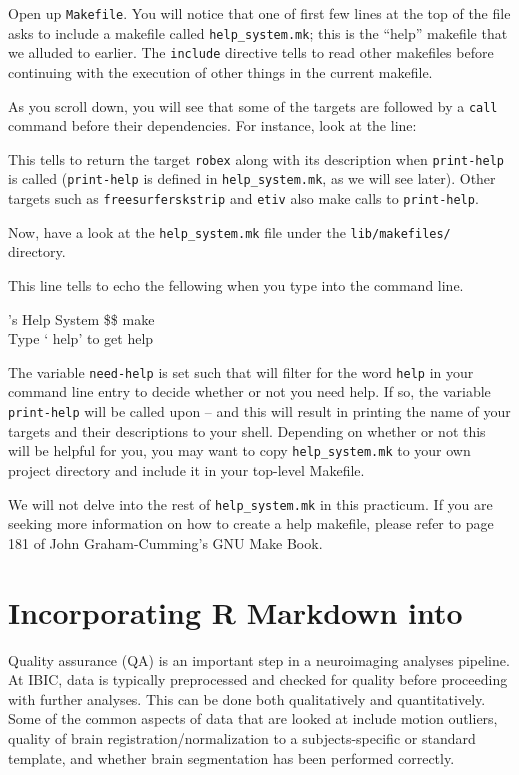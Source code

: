Open up \texttt{Makefile}. You will notice that one of first few lines at the top of the file asks \maken{} to include a makefile called \texttt{help_system.mk}; this is the ``help'' makefile that we alluded to earlier. The \texttt{include} directive tells \maken{} to read other makefiles before continuing with the execution of other things in the current makefile.  

As you scroll down, you will see that some of the targets are followed by a \texttt{call} command before their dependencies. For instance, look at the line:

This tells \maken{} to return the target \texttt{robex} along with its description when \texttt{print-help} is called (\texttt{print-help} is defined in \texttt{help_system.mk}, as we will see later). Other targets such as \texttt{freesurferskstrip} and \texttt{etiv} also make calls to \texttt{print-help}.

Now, have a look at the \texttt{help_system.mk} file under the \texttt{lib/makefiles/} directory.  

This line tells \maken{} to echo the fellowing when you type \maken{} into the command line.
\begin{bash}{\maken{}'s Help System}{}
\$\$ make \\
Type `\maken{} help' to get help
\end{bash}

The variable \texttt{need-help} is set such that \maken{} will filter for the word \texttt{help} in your command line entry to decide whether or not you need help. If so, the variable \texttt{print-help} will be called upon -- and this will result in \maken{} printing the name of your targets and their descriptions to your shell. Depending on whether or not this will be helpful for you, you may want to copy \texttt{help_system.mk} to your own project directory and include it in your top-level Makefile. 

We will not delve into the rest of \texttt{help_system.mk} in this practicum. If you are seeking more information on how to create a help makefile, please refer to page 181 of John Graham-Cumming's GNU Make Book. 

\section{Incorporating R Markdown into \maken{}}
Quality assurance (QA) is an important step in a neuroimaging analyses pipeline. At IBIC, data is typically  preprocessed and checked for quality before proceeding with further analyses. This can be done both qualitatively and quantitatively. Some of the common aspects of data that are looked at include motion outliers, quality of brain registration/normalization to a subjects-specific or standard template, and whether brain segmentation has been performed correctly. 

